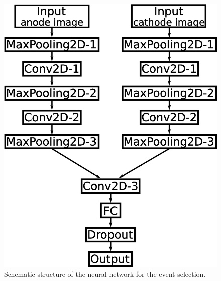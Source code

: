 \documentclass{jps-cp}
\begin{document}
\vspace{0zw}
\begin{figure}
  \centering
  \begin{minipage}{0.4\columnwidth}
    \centering
    \includegraphics[clip, width=0.9\columnwidth]{eps/event_selection.eps}
    \caption{Schematic structure of the neural network for the event selection.}
    \label{fig:selection}
  \end{minipage}
  \hfill
  \begin{minipage}{0.4\columnwidth}
    \centering

\end{minipage}
\end{figure}
\end{document}

